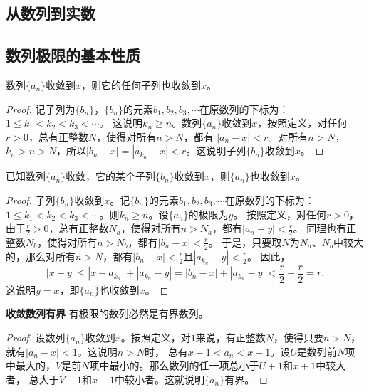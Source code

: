 \documentclass[12pt,UTF8,fontset=none]{ctexbook}
\begin{document}
\begin{appendix}

\chapter{从数列到实数}
\section{数列极限的基本性质}

\begin{tm}\label{tm:a-0-10}
    数列$\{a_n\}$收敛到$x$，则它的任何子列也收敛到$x$。
\end{tm}
\begin{proof}
    记子列为$\{b_n\}$，$\{b_n\}$的元素$b_1,b_2,b_3,\cdots$在原数列的下标为：$1\leqslant k_1<k_2<k_3<\cdots$。
    这说明$k_n \geqslant n$。数列$\{a_n\}$收敛到$x$，按照定义，对任何$r>0$，总有正整数$N$，使得对所有$n>N$，都有
    $ |a_n - x| < r$。对所有$n>N$，$k_n>n>N$，所以$|b_n - x| = |a_{k_n} - x| < r$。这说明子列$\{b_n\}$收敛到$x$。
\end{proof}

\begin{tm}\label{tm:a-0-20}
    已知数列$\{a_n\}$收敛，它的某个子列$\{b_n\}$收敛到$x$，则$\{a_n\}$也收敛到$x$。
 \end{tm}
\begin{proof}
    子列$\{b_n\}$收敛到$x$。记$\{b_n\}$的元素$b_1,b_2,b_3,\cdots$在原数列的下标为：
    $1\leqslant k_1<k_2<k_3<\cdots$。则$k_n \geqslant n$。设$\{a_n\}$的极限为$y$。
    按照定义，对任何$r>0$，由于$\frac{r}{2} > 0$，总有正整数$N_a$，使得对所有$n>N_a$，都有$ |a_n - y| < \frac{r}{2}$。
    同理也有正整数$N_b$，使得对所有$n>N_b$，都有$ |b_n - x| < \frac{r}{2}$。
    于是，只要取$N$为$N_a$、$N_b$中较大的，那么对所有$n>N$，都有$|b_n - x| < \frac{r}{2}$且$ |a_{k_n} - y| < \frac{r}{2}$。
    因此，
    $$|x - y| \leqslant |x - a_{k_n}| + |a_{k_n} - y| = |b_n - x| + |a_{k_n} - y| < \frac{r}{2} + \frac{r}{2} = r. $$
    这说明$y = x$，即$\{a_n\}$也收敛到$x$。
\end{proof}

\begin{tm}{\textbf{收敛数列有界}}\label{tm:a-0-30}
    有极限的数列必然是有界数列。
\end{tm}
\begin{proof}
    设数列$\{a_n\}$收敛到$x$。按照定义，对$1$来说，有正整数$N$，使得只要$n>N$，就有$|a_n - x| < 1$。这说明$n>N$时，
    总有$x - 1 < a_n < x + 1$。设$U$是数列前$N$项中最大的，$V$是前$N$项中最小的。那么数列的任一项总小于$U+1$和$x+1$中较大者，
    总大于$V-1$和$x-1$中较小者。这就说明$\{a_n\}$有界。
\end{proof}


\end{appendix}
\end{document}
